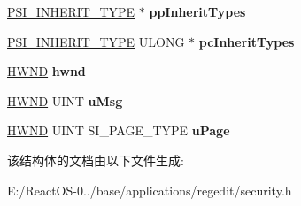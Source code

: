 \begin{DoxyCompactItemize}
\hyperlink{struct___s_i___i_n_h_e_r_i_t___t_y_p_e}{P\+S\+I\+\_\+\+I\+N\+H\+E\+R\+I\+T\+\_\+\+T\+Y\+PE} $\ast$ {\bfseries pp\+Inherit\+Types}
\item 
\mbox{\label{structiface_i_security_information_vbtl_ae335bb3e769232756c2a533f2da37402}} 
\hyperlink{struct___s_i___i_n_h_e_r_i_t___t_y_p_e}{P\+S\+I\+\_\+\+I\+N\+H\+E\+R\+I\+T\+\_\+\+T\+Y\+PE} U\+L\+O\+NG $\ast$ {\bfseries pc\+Inherit\+Types}
\item 
\mbox{\label{structiface_i_security_information_vbtl_adeec826cd3b849878ed883cf50b35b63}} 
\hyperlink{interfacevoid}{H\+W\+ND} {\bfseries hwnd}
\item 
\mbox{\label{structiface_i_security_information_vbtl_ac6507708e26e27a807704eaac812f2f4}} 
\hyperlink{interfacevoid}{H\+W\+ND} U\+I\+NT {\bfseries u\+Msg}
\item 
\mbox{\label{structiface_i_security_information_vbtl_ad965f67a3cd34b6f4e127b2899a0f19c}} 
\hyperlink{interfacevoid}{H\+W\+ND} U\+I\+NT S\+I\+\_\+\+P\+A\+G\+E\+\_\+\+T\+Y\+PE {\bfseries u\+Page}
\end{DoxyCompactItemize}


该结构体的文档由以下文件生成\+:\begin{DoxyCompactItemize}
\item 
E\+:/\+React\+O\+S-\/0../base/applications/regedit/security.\+h\end{DoxyCompactItemize}
